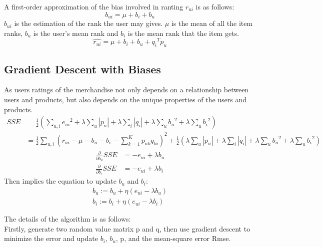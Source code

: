 \documentclass[]{article}
\begin{document}
A first-order approximation of the bias involved in ranting $r_{ui}$ is as follows:
\begin{equation}
b_{ui}=\mu+b_i+b_u
\end{equation}
$b_{ui}$ is the estimation of the rank the user may gives. $\mu$ is the mean of all the item ranks, $b_u$ is the user's mean rank and $b_i$ is the mean rank that the item gets.
\begin{equation}
\hat{r_{ui}}=\mu +b_i+b_u+{q_i}^Tp_{u}
\end{equation}
\subsection{Gradient Descent with Biases}
As users ratings of the merchandise not only depends on a relationship between users and products, but also depends on the unique properties of the users and products.
\begin{equation}
\begin{split}
SSE&=\frac{1}{2}(\sum_{u,i}{e_{ui}}^2+\lambda \sum_{u}|p_u|+\lambda \sum_{i}|q_i|+\lambda \sum_u {b_u}^2+\lambda \sum_u{b_i}^2)\\
	&=\frac{1}{2}\sum_{u,i}(r_{ui}-\mu-b_u-b_i-\sum_{k=1}^{K}p_{uk}q_{ki})^2+\frac{1}{2}(\lambda \sum_{u}|p_u|+\lambda \sum_{i}|q_i|+\lambda \sum_u {b_u}^2+\lambda \sum_u{b_i}^2)
\end{split}
\end{equation}
\begin{equation}
\begin{split}
\frac{\partial }{\partial b_{u}}SSE&=-e_{ui}+\lambda b_u \\
\frac{\partial }{\partial b_{i}}SSE&=-e_{ui}+\lambda b_i 
\end{split}
\end{equation}
Then implies the equation to update $b_u$ and $b_i$:
\begin{equation}
\begin{split}
b_u := b_u +\eta(e_{ui}-\lambda b_u)\\
b_i := b_i +\eta(e_{ui}-\lambda b_i)
\end{split}
\end{equation}


The details of the algorithm is as follows:\\


Firstly, generate two random value matrix p and q, then use gradient descent to minimize the error and update $b_i$, $b_u$, p, and the mean-square error Rmse.\\
\end{document}

